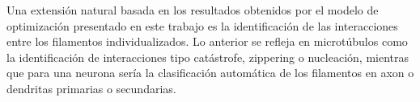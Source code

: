 Una extensi\'on natural basada en los resultados obtenidos por el modelo de optimizaci\'on presentado en este trabajo es la identificaci\'on de las interacciones entre los filamentos individualizados. Lo anterior se refleja en microt\'ubulos como la identificaci\'on de interacciones tipo cat\'astrofe, zippering o nucleaci\'on, mientras que para una neurona ser\'ia la clasificaci\'on autom\'atica de los filamentos en axon o dendritas primarias o secundarias. 
